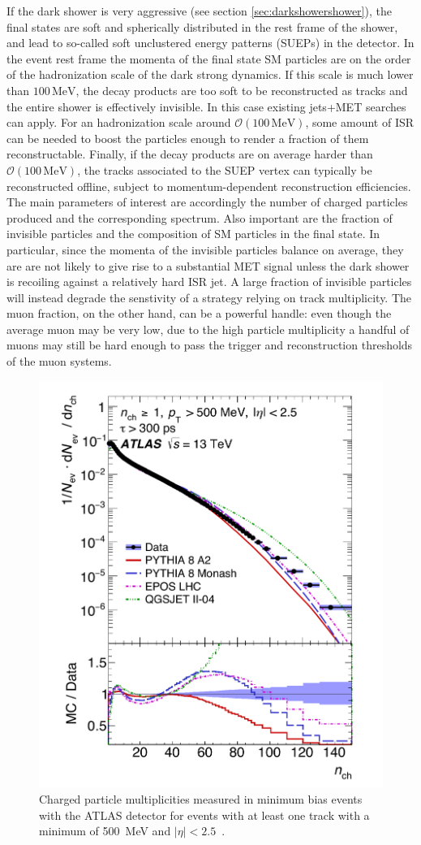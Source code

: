 If the dark shower is very aggressive (see section \ref{sec:darkshowershower}), the final states are soft and spherically distributed in the rest frame of the shower, and lead to so-called soft unclustered energy patterns (SUEPs) in the detector. In the event rest frame the momenta of the final state SM particles are on the order of the hadronization scale of the dark strong dynamics. If this scale is much lower than $100\,\textrm{MeV}$, the decay products are too soft to be reconstructed as tracks and the entire shower is effectively invisible. In this case existing jets+MET searches can apply. For an hadronization scale around $\mathcal{O}(100\,\textrm{MeV})$, some amount of ISR can be needed to boost the particles enough to render a fraction of them reconstructable. Finally, if the decay products are on average harder than $\mathcal{O}(100\,\textrm{MeV})$, the tracks associated to the SUEP vertex can typically be reconstructed offline, subject to momentum-dependent reconstruction efficiencies. The main parameters of interest are accordingly the number of charged particles produced and the corresponding \pt spectrum. Also important are the fraction of invisible particles and the composition of SM particles in the final state.  In particular, since the momenta of the invisible particles balance on average, they are are not likely to give rise to a substantial MET signal unless the dark shower is recoiling against a relatively hard ISR jet. A large fraction of invisible particles will instead degrade the senstivity of a strategy relying on track multiplicity. The muon fraction, on the other hand, can be a powerful handle: even though the average muon \pt may be very low, due to the high particle multiplicity a handful of muons may still be hard enough to pass the trigger and reconstruction thresholds of the muon systems. 

\begin{figure}[tbp]
  \centering
  \includegraphics[width=.5\textwidth]{figures/DS_chargedParticleMultiplicities_pileup.pdf}
  \caption{Charged particle multiplicities measured in minimum bias events with the ATLAS detector for events with at least one track with a minimum \pt of 500~MeV and $|\eta|< 2.5$~\cite{Aad:2016mok}.}
  \label{fig:PILEUPchargedParticleMultiplicities}
\end{figure}

